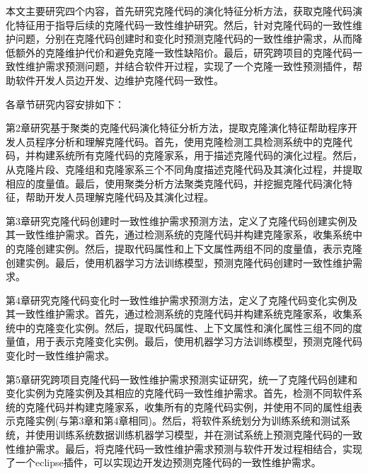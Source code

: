 本文主要研究四个内容，首先研究克隆代码的演化特征分析方法，获取克隆代码演化特征用于指导后续的克隆代码一致性维护研究。然后，针对克隆代码的一致性维护问题，分别在克隆代码创建时和变化时预测克隆代码的一致性维护需求，从而降低额外的克隆维护代价和避免克隆一致性缺陷价。最后，研究跨项目的克隆代码一致性维护需求预测问题，并结合软件开过程，实现了一个克隆一致性预测插件，帮助软件开发人员边开发、边维护克隆代码一致性。

各章节研究内容安排如下：

第2章研究基于聚类的克隆代码演化特征分析方法，提取克隆演化特征帮助程序开发人员程序分析和理解克隆代码。首先，使用克隆检测工具检测系统中的克隆代码，并构建系统所有克隆代码的克隆家系，用于描述克隆代码的演化过程。然后，从克隆片段、克隆组和克隆家系三个不同角度描述克隆代码及其演化过程，并提取相应的度量值。最后，使用聚类分析方法聚类克隆代码，并挖掘克隆代码演化特征，帮助开发人员理解克隆代码及其演化过程。

第3章研究克隆代码创建时一致性维护需求预测方法，定义了克隆代码创建实例及其一致性维护需求。首先，通过检测系统的克隆代码并构建克隆家系，收集系统中的克隆创建实例。然后，提取代码属性和上下文属性两组不同的度量值，表示克隆创建实例。最后，使用机器学习方法训练模型，预测克隆代码创建时一致性维护需求。

第4章研究克隆代码变化时一致性维护需求预测方法，定义了克隆代码变化实例及其一致性维护需求。首先，通过检测系统的克隆代码并构建系统克隆家系，收集系统中的克隆变化实例。然后，提取代码属性、上下文属性和演化属性三组不同的度量值，用于表示克隆变化实例。最后，使用机器学习方法训练模型，预测克隆代码变化时一致性维护需求。

第5章研究跨项目克隆代码一致性维护需求预测实证研究，统一了克隆代码创建和变化实例为克隆实例及其相应的克隆代码一致性维护需求。首先，检测不同软件系统的克隆代码并构建克隆家系，收集所有的克隆代码实例，并使用不同的属性组表示克隆实例(与第3章和第4章相同)。然后，将软件系统划分为训练系统和测试系统，并使用训练系统数据训练机器学习模型，并在测试系统上预测克隆代码的一致性维护需求。最后，将克隆代码一致性维护需求预测与软件开发过程相结合，实现了一个eclipse插件，可以实现边开发边预测克隆代码的一致性维护需求。
